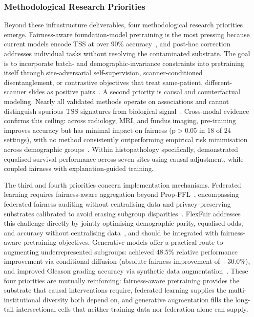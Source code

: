 \subsubsection{Methodological Research Priorities}
Beyond these infrastructure deliverables, four methodological research priorities emerge. Fairness-aware foundation-model pretraining is the most pressing because current models encode TSS at over 90\% accuracy~\citep{komen2024batch}, and post-hoc correction addresses individual tasks without resolving the contaminated substrate. The goal is to incorporate batch- and demographic-invariance constraints into pretraining itself through site-adversarial self-supervision, scanner-conditioned disentanglement, or contrastive objectives that treat same-patient, different-scanner slides as positive pairs~\citep{huang2025knowledge, lin2025contrastive}. A second priority is causal and counterfactual modeling. Nearly all validated methods operate on associations and cannot distinguish spurious TSS signatures from biological signal~\citep{howard2021site, komen2024batch}. Cross-modal evidence confirms this ceiling: across radiology, MRI, and fundus imaging, pre-training improves accuracy but has minimal impact on fairness (p$>$0.05 in 18 of 24 settings), with no method consistently outperforming empirical risk minimisation across demographic groups~\citep{pham2025boundaries}. Within histopathology specifically, \citet{correamedero2024causal} demonstrated equalised survival performance across seven sites using causal adjustment, while \citet{shabazian2025joint} coupled fairness with explanation-guided training.

The third and fourth priorities concern implementation mechanisms. Federated learning requires fairness-aware aggregation beyond Prop-FFL~\citep{hosseini2023proportionally}, encompassing federated fairness auditing without centralising data and privacy-preserving substrates calibrated to avoid erasing subgroup disparities~\citep{lu2022federated}. FlexFair addresses this challenge directly by jointly optimising demographic parity, equalised odds, and accuracy without centralising data~\citep{xing2025flexfair}, and should be integrated with fairness-aware pretraining objectives. Generative models offer a practical route to augmenting underrepresented subgroups: \citet{ktena2024generative} achieved 48.5\% relative performance improvement via conditional diffusion (absolute fairness improvement of $\pm$30.0\%), and \citet{vanbooven2025mitigating} improved Gleason grading accuracy via synthetic data augmentation~\citep{ktena2024generative, vanbooven2025mitigating}. These four priorities are mutually reinforcing: fairness-aware pretraining provides the substrate that causal interventions require, federated learning supplies the multi-institutional diversity both depend on, and generative augmentation fills the long-tail intersectional cells that neither training data nor federation alone can supply.

